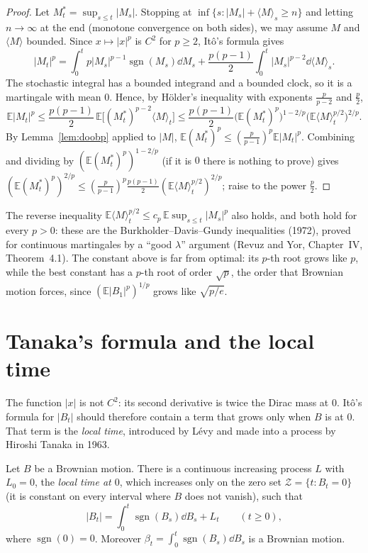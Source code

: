 \begin{proof}
Let $M^*_t=\sup_{s\le t}|M_s|$. Stopping at $\inf\{s:|M_s|+\langle M\rangle_s\ge n\}$ and letting $n\to\infty$ at the end (monotone convergence on both sides), we may assume $M$ and $\langle M\rangle$ bounded. Since $x\mapsto|x|^p$
is $C^2$ for $p\ge2$, It\^o's formula gives
\[
|M_t|^p=\int_0^tp|M_s|^{p-1}\operatorname{sgn}(M_s)\dd M_s+\frac{p(p-1)}2\int_0^t|M_s|^{p-2}\dd\langle M\rangle_s .
\]
The stochastic integral has a bounded integrand and a bounded clock, so it is a martingale with mean $0$. Hence, by H\"older's inequality with exponents $\frac p{p-2}$ and $\frac p2$,
\[
\mathbb E|M_t|^p\le\frac{p(p-1)}2\,\mathbb E\bigl[(M^*_t)^{p-2}\langle M\rangle_t\bigr]\le\frac{p(p-1)}2\bigl(\mathbb E(M^*_t)^p\bigr)^{1-2/p}\bigl(\mathbb E\langle M\rangle_t^{p/2}\bigr)^{2/p}.
\]
By Lemma~\ref{lem:doobp} applied to $|M|$, $\mathbb E(M^*_t)^p\le(\frac p{p-1})^p\mathbb E|M_t|^p$. Combining and dividing by $(\mathbb E(M^*_t)^p)^{1-2/p}$ (if it is $0$ there is nothing to prove) gives
$(\mathbb E(M^*_t)^p)^{2/p}\le(\frac p{p-1})^p\frac{p(p-1)}2(\mathbb E\langle M\rangle_t^{p/2})^{2/p}$; raise to the power $\frac p2$.
\end{proof}

\begin{remark}
The reverse inequality $\mathbb E\langle M\rangle_t^{p/2}\le c_p\,\mathbb E\sup_{s\le t}|M_s|^p$ also holds, and both hold for every $p>0$: these are the Burkholder--Davis--Gundy inequalities (1972), proved for
continuous martingales by a ``good $\lambda$'' argument (Revuz and Yor, Chapter~IV, Theorem~4.1). The constant above is far from optimal: its $p$-th root grows like $p$, while the best constant has a $p$-th root of order $\sqrt p$, the order that Brownian motion forces, since $(\mathbb E|B_1|^p)^{1/p}$ grows like $\sqrt{p/e}$.
\end{remark}

\section{Tanaka's formula and the local time}

The function $|x|$ is not $C^2$: its second derivative is twice the Dirac mass at $0$. It\^o's formula for $|B_t|$ should therefore contain a term that grows only when $B$ is at $0$. That term is the
\emph{local time}, introduced by L\'evy and made into a process by Hiroshi Tanaka in 1963.

\begin{theorem}\label{thm:tanaka}
Let $B$ be a Brownian motion. There is a continuous increasing process $L$ with $L_0=0$, the \emph{local time at $0$}, which increases only on the zero set $\mathcal Z=\{t:B_t=0\}$ (it is constant on every interval where
$B$ does not vanish), such that
\[
|B_t|=\int_0^t\operatorname{sgn}(B_s)\dd B_s+L_t\qquad(t\ge0),
\]
where $\operatorname{sgn}(0)=0$. Moreover $\beta_t=\int_0^t\operatorname{sgn}(B_s)\dd B_s$ is a Brownian motion.
\end{theorem}

